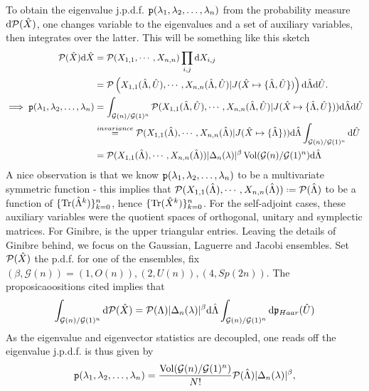 To obtain the eigenvalue j.p.d.f. $\mathtt{p}(\lambda_1, \lambda_2, \dots, \lambda_n)$ from the probability measure $\mathrm{d} \mathcal{P}(\hat X)$, one changes variable to the eigenvalues and a set of auxiliary variables, then integrates over the latter. This will be something like this sketch
\begin{equation}
	\begin{split}
		\mathcal{P}(\hat X) \mathrm{d} \hat X & = \mathcal{P}(X_{1,1}, \cdots , X_{n,n}) \prod_{i,j} \mathrm{d} X_{i,j} \\
		& = \mathcal{P} \left(X_{1,1}(\hat\Lambda, \hat U), \cdots , X_{n,n}(\hat\Lambda, \hat U) | J(\hat X \mapsto \{\hat\Lambda, \hat U\})\right) \mathrm{d} \hat\Lambda \mathrm{d} \hat U. \\
		\implies \mathtt{p}(\lambda_1, \lambda_2, \dots, \lambda_n) & = \int_{\mathcal{G}(n)/\mathcal{G}(1)^n} \mathcal{P}(X_{1,1}(\hat\Lambda, \hat U), \cdots , X_{n,n}(\hat\Lambda, \hat U)| J(\hat X \mapsto \{\hat\Lambda, \hat U\})) \mathrm{d} \hat\Lambda \mathrm{d} \hat U \\
		& \stackrel{invariance}{=} \mathcal{P}(X_{1,1}(\hat\Lambda), \cdots , X_{n,n}(\hat\Lambda)| J(\hat X \mapsto \{\hat\Lambda\})) \mathrm{d} \hat\Lambda \int_{\mathcal{G}(n)/\mathcal{G}(1)^n} \mathrm{d} \hat U \\
		& = \mathcal{P}(X_{1,1}(\hat\Lambda), \cdots , X_{n,n}(\hat\Lambda)) |\Delta_n(\lambda)|^\beta \operatorname{Vol}(\mathcal{G}(n)/\mathcal{G}(1)^n) \mathrm{d} \hat\Lambda
	\end{split}
\end{equation}
A nice observation is that we know $\mathtt{p}(\lambda_1, \lambda_2, \dots, \lambda_n)$ to be a multivariate symmetric function - this implies that $\eP(X_{1,1}(\m{\Lambda}), \cdots , X_{n,n}(\m{\Lambda})) \deff \eP(\m{\Lambda})$ to be a function of $\{\operatorname{Tr}(\hat\Lambda^k)\}_{k=0}^{n}$, hence $\{\operatorname{Tr}(\hat X^k)\}_{k=0}^{n}$. For the self-adjoint cases, these auxiliary variables were the quotient spaces of orthogonal, unitary and symplectic matrices. For Ginibre, is the upper triangular entries. Leaving the details of Ginibre behind, we focus on the Gaussian, Laguerre and Jacobi ensembles. Set $\mathcal{P}(\hat X)$ the p.d.f. for one of the ensembles, fix $(\beta,\mathcal{G}(n)) = (1, O(n)), (2, U(n)), (4, Sp(2n))$. The proposicaoositions cited implies that
\begin{equation}
	\int_{\mathcal{G}(n)/\mathcal{G}(1)^n} \mathrm{d} \mathcal{P}(\hat X) = \mathcal{P}(\Lambda) |\Delta_n(\lambda)|^\beta \mathrm{d} \hat\Lambda \int_{\mathcal{G}(n)/\mathcal{G}(1)^n} \mathrm{d} \mathfrak{p}_{Haar}(\hat U)
\end{equation}
As the eigenvalue and eigenvector statistics are decoupled, one reads off the eigenvalue j.p.d.f. is thus given by 
\begin{equation}
	\mathtt{p}(\lambda_1, \lambda_2, \dots, \lambda_n) = \frac{\operatorname{Vol}(\mathcal{G}(n)/\mathcal{G}(1)^n)}{N!} \mathcal{P}(\hat\Lambda) |\Delta_n(\lambda)|^\beta,
\end{equation}
